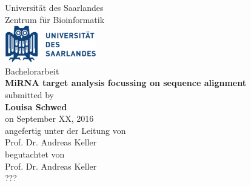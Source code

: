 \documentclass[12pt]{article}
\begin{document}
\def\supervisorIname{Advisor I}
\def\supervisorIIname{Second Reviewer}

	\def\university{Universit\"{a}t des Saarlandes}
	\def\institute{Center for Bioinformatics}
	\def\chair{Bachelor-Studiengang Bioinformatik }
	\def\projectname{MiRNA target analysis focussing on sequence alignment}
	\vspace{.2em}  
	\def\author{Louisa Schwed}
	\def\date{September 2016}

\begin{titlepage}

  \begin{minipage}{\textwidth}
    \begin{center}
    { \large Universität des Saarlandes \\ Zentrum für Bioinformatik\\}
	\vspace{0.5cm}
    \includegraphics[width=4cm]{Logo-Universitaet_des_Saarlandes.pdf}\\
    \vspace{1.5cm}
    { \large Bachelorarbeit\\}
    \vspace{0.5cm}
    {\huge\textbf{\projectname}}\\
    \vspace{1.5cm}
    { \large submitted by}\\
	\vspace{0.5cm}
    {\large\textbf{\author}}\\
    \vspace{0.5cm}
    {\large on September XX, 2016}\\
    \vspace{1.5cm}
    {\large angefertig unter der Leitung von}\\
    \vspace{0.5cm}
    {\large Prof. Dr. Andreas Keller}\\
    \vspace{1.5cm}
    {\large begutachtet von}\\
    \vspace{0.5cm}
    {\large Prof. Dr. Andreas Keller}\\
   	{\large ???}\\
    \vspace{0.5cm}
    \end{center}
  \end{minipage}   
   

\end{titlepage}
\end{document}
